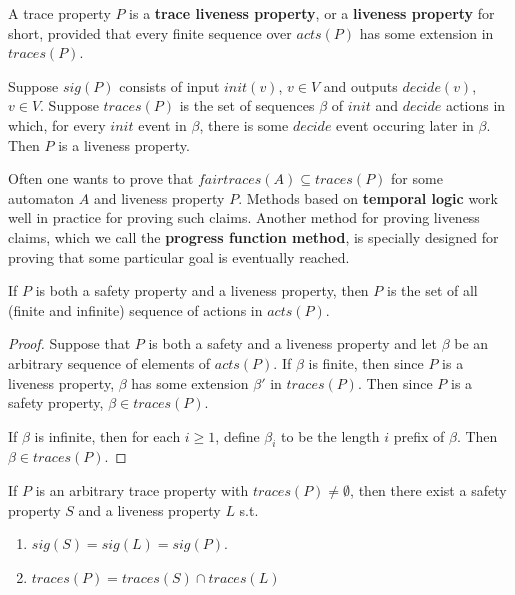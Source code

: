 \documentclass[11pt]{article}
\begin{document}
\begin{definition}[]
A trace property \(P\) is a \textbf{trace liveness property}, or a \textbf{liveness property} for short, provided that
every finite sequence over \(acts(P)\) has some extension in \(traces(P)\).
\end{definition}

\begin{examplle}[]
Suppose \(sig(P)\) consists of input \(init(v)\), \(v\in V\) and outputs \(decide(v)\), \(v\in V\).
Suppose \(traces(P)\) is the set of sequences \(\beta\) of \(init\) and \(decide\) actions in which,
for every \(init\) event in \(\beta\), there is some \(decide\) event occuring later in \(\beta\).
Then \(P\)  is a liveness property.
\end{examplle}

Often one wants to prove that \(fairtraces(A)\subseteq traces(P)\) for some automaton \(A\) and
liveness property \(P\). Methods based on \textbf{temporal logic} work well in practice for proving such
claims. Another method for proving liveness claims, which we call the \textbf{progress function method}, is
specially designed for proving that some particular goal is eventually reached.

\begin{theorem}[]
If \(P\) is both a safety property and a liveness property, then \(P\) is the set of all (finite and
infinite) sequence of actions in \(acts(P)\).
\end{theorem}

\begin{proof}
Suppose that \(P\) is both a safety and a liveness property and let \(\beta\) be an arbitrary sequence
of elements of \(acts(P)\). If \(\beta\) is finite, then since \(P\) is a liveness property, \(\beta\)
has some extension \(\beta'\) in \(traces(P)\). Then since \(P\) is a safety property, \(\beta\in
        traces(P)\).

If \(\beta\) is infinite, then for each \(i\ge 1\), define \(\beta_i\) to be the length \(i\) prefix
of \(\beta\). Then \(\beta\in traces(P)\).
\end{proof}

\begin{theorem}[]
If \(P\) is an arbitrary trace property with \(traces(P)\neq\emptyset\), then there exist a safety
property \(S\) and a liveness property \(L\) s.t.
\begin{enumerate}
\item \(sig(S)=sig(L)=sig(P)\).
\item \(traces(P)=traces(S)\cap traces(L)\)
\end{enumerate}
\end{theorem}
\end{document}
